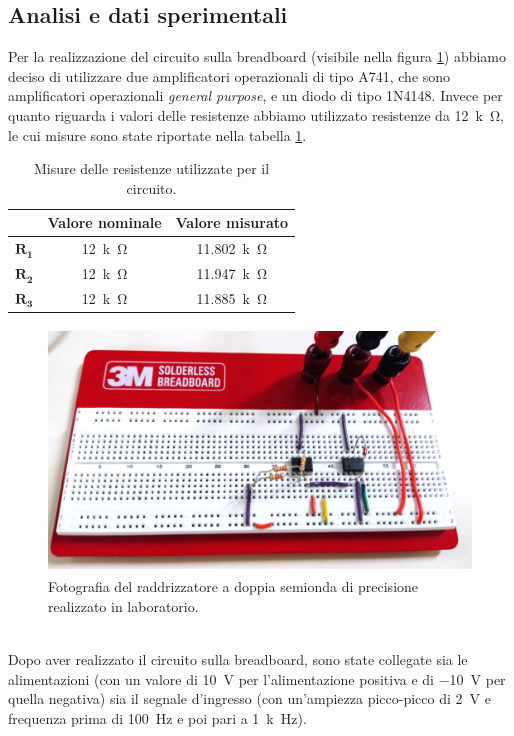 \documentclass{report}
\begin{document}
\subsection{Analisi e dati sperimentali}
Per la realizzazione del circuito sulla breadboard (visibile nella figura \ref{figura:circuito1}) abbiamo deciso di utilizzare due amplificatori operazionali di tipo \textmu A741, che sono amplificatori operazionali \textit{general purpose}, e un diodo di tipo 1N4148.
Invece per quanto riguarda i valori delle resistenze abbiamo utilizzato resistenze da \SI{12}{k\ohm}, le cui misure sono state riportate nella tabella \ref{table:mis_res1}.
\begin{table}[h!]
	\centering
	\begin{tabular}{|c|c|c|}
		\cline{2-3} 
		\multicolumn{1}{c|}{} & \textbf{Valore nominale} & \textbf{Valore misurato}\\ 
		\hline
		$\mathbf{R_1}$ & \SI{12}{k\ohm} & \SI{11.802}{k\ohm} \\ 
		\hline
		$\mathbf{R_2}$ & \SI{12}{k\ohm} & \SI{11.947}{k\ohm} \\ 
		\hline
		$\mathbf{R_3}$ & \SI{12}{k\ohm} & \SI{11.885}{k\ohm} \\ 
		\hline
	\end{tabular}
	\caption{Misure delle resistenze utilizzate per il circuito.}
	\label{table:mis_res1}
\end{table}
\begin{figure}[h]
	\centering
	\includegraphics[height=6.5cm]{immagini/circuito1}
	\caption{Fotografia del raddrizzatore a doppia semionda di precisione realizzato in laboratorio.}
	\label{figura:circuito1}
\end{figure}
\\ Dopo aver realizzato il circuito sulla breadboard, sono state collegate sia le alimentazioni (con un valore di \SI{+10}{\volt} per l'alimentazione positiva e di \SI{-10}{\volt} per quella negativa) sia il segnale d'ingresso (con un'ampiezza picco-picco di \SI{2}{\volt} e frequenza prima di \SI{100}{\hertz} e poi pari a \SI{1}{k\hertz}).\par
\end{document}
